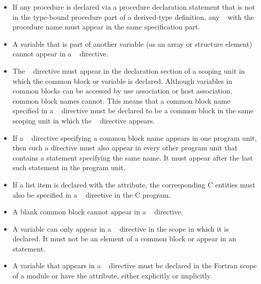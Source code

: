 {{{{\begin{itemize}
\item If any procedure is declared via a procedure declaration statement 
      that is not in the type-bound procedure part of a derived-type 
      definition, any ~ with the procedure 
      name must appear in the same specification part.

\item A variable that is part of another variable (as an array or structure 
      element) cannot appear in a ~ directive.

\item The ~ directive must appear in the 
      declaration section of a scoping unit in which the common block 
      or variable is declared. Although variables in common blocks can 
      be accessed by use association or host association, common block 
      names cannot. This means that a common block name specified in a 
      ~ directive must be declared to be a 
      common block in the same scoping unit in which the 
      ~ directive appears.

\item If a ~ directive specifying a common 
      block name appears in one program unit, then such a directive must 
      also appear in every other program unit that contains a  
      statement specifying the same name. It must appear after the last 
      such  statement in the program unit.

\item If a list item is declared with the  attribute, the 
      corresponding C entities must also be specified in a 
      ~ directive in the C program.

\item A blank common block cannot appear in a ~ 
      directive.

\item A variable can only appear in a ~ directive 
      in the scope in which it is declared. It must not be an element of a 
      common block or appear in an  statement.

\item A variable that appears in a ~ directive 
      must be declared in the Fortran scope of a module or have the 
       attribute, either explicitly or implicitly. 
\end{itemize}
\fortranspecificend







}}}}

